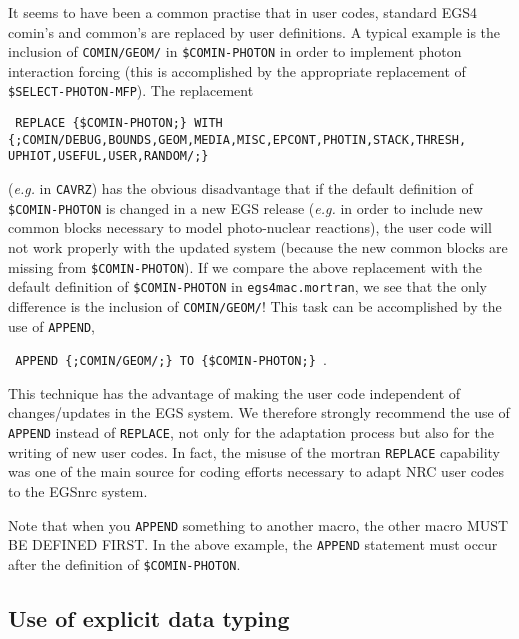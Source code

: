 It seems to have been a common practise that in user codes, standard
EGS4 comin's and common's are replaced by user definitions.
A typical example is the inclusion of {\tt COMIN/GEOM/} in
{\tt \$COMIN-PHOTON} in order to implement photon interaction
forcing (this is accomplished by the appropriate replacement
of {\tt \$SELECT-PHOTON-MFP}). The replacement
\begin{flushleft}
{\tt
REPLACE \{\$COMIN-PHOTON;\} WITH\\
\{;COMIN/DEBUG,BOUNDS,GEOM,MEDIA,MISC,EPCONT,PHOTIN,STACK,THRESH,\\
\quad \quad UPHIOT,USEFUL,USER,RANDOM/;\} }
\end{flushleft}
({\em e.g.} in {\tt CAVRZ}) has the obvious disadvantage that if
the default definition of {\tt \$COMIN-PHOTON} is changed
in a new EGS release
({\em e.g.} in order to include new common blocks necessary
to model photo-nuclear reactions), the user code will not work
properly with the updated system (because the new common blocks
are missing from  {\tt \$COMIN-PHOTON}). If we compare the
above replacement with the default definition of
{\tt \$COMIN-PHOTON} in {\tt egs4mac.mortran}, we see that the only
difference is the inclusion of {\tt COMIN/GEOM/}! This
task can be accomplished by the use of {\tt APPEND},
\begin{flushleft}
{\tt
APPEND \{;COMIN/GEOM/;\} TO \{\$COMIN-PHOTON;\} }.
\end{flushleft}
This technique has the advantage of making the user code
independent of changes/updates in the EGS system.
We therefore strongly recommend the use of {\tt APPEND}
instead of {\tt REPLACE}, not only for the adaptation process but
also for the writing of new user codes. In fact, the
misuse of the mortran {\tt REPLACE} capability was one
of the main source for coding efforts necessary to adapt
NRC user codes to the EGSnrc system.

Note that when you {\tt APPEND} something to another macro, the other macro
MUST BE DEFINED FIRST. In the above example, the {\tt APPEND} statement must
occur after the definition of {\tt \$COMIN-PHOTON}.

\subsection{Use of explicit data typing}
\label{implicit}

